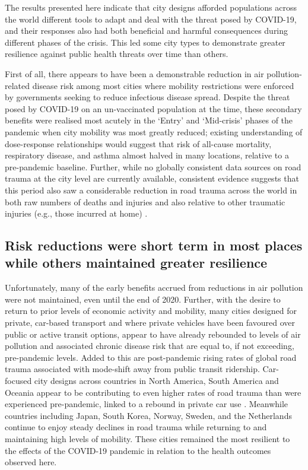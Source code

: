 \documentclass[preprint,10pt]{elsarticle} %
\begin{document}
The results presented here indicate that city designs afforded populations across the world different tools to adapt and deal with the threat posed by COVID-19, and their responses also had both beneficial and harmful consequences during different phases of the crisis. This led some city types to demonstrate greater resilience against public health threats over time than others.

First of all, there appears to have been a demonstrable reduction in air pollution-related disease risk among most cities where mobility restrictions were enforced by governments seeking to reduce infectious disease spread. Despite the threat posed by COVID-19 on an un-vaccinated population at the time, these secondary benefits were realised most acutely in the `Entry' and `Mid-crisis' phases of the pandemic when city mobility was most greatly reduced; existing understanding of dose-response relationships would suggest that risk of all-cause mortality, respiratory disease, and asthma  almost halved in many locations, relative to a pre-pandemic baseline. Further, while no globally consistent data sources on road trauma at the city level are currently available, consistent evidence suggests that this period also saw a considerable reduction in road trauma across the world in both raw numbers of deaths and injuries \cite{saladie2023back} and also relative to other traumatic injuries (e.g., those incurred at home) \cite{WASEEM2021200}.

\subsection*{Risk reductions were short term in most places while others maintained greater resilience}
Unfortunately, many of the early benefits accrued from reductions in air pollution were not maintained, even until the end of 2020. Further, with the desire to return to prior levels of economic activity and mobility, many cities designed for private, car-based transport and where private vehicles have been favoured over public or active transit options\cite{DAS20211}, appear to have already rebounded to levels of air pollution and associated chronic disease risk that are equal to, if not exceeding, pre-pandemic levels. Added to this are post-pandemic rising rates of global road trauma associated with mode-shift away from public transit ridership. Car-focused city designs across countries in North America, South America and Oceania appear to be contributing to even higher rates of road trauma than were experienced pre-pandemic, linked to a rebound in private car use \cite{ITFRS}. Meanwhile countries including Japan, South Korea, Norway, Sweden, and the Netherlands continue to enjoy steady declines in road trauma while returning to and maintaining high levels of mobility. These cities remained the most resilient to the effects of the COVID-19 pandemic in relation to the health outcomes observed here.
\end{document}
